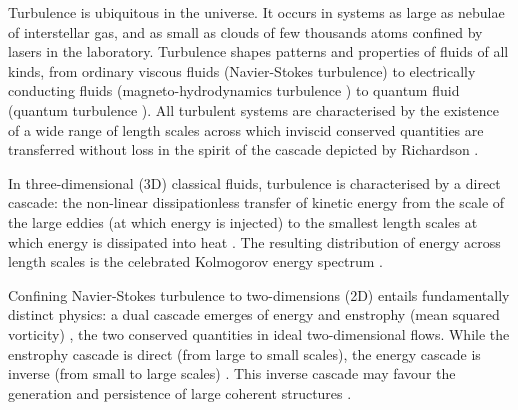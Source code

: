 \documentclass[%
 reprint,
 amsmath,amssymb,
 aps,
 prl,
]{revtex4-2}
\def\magenta#1{\textcolor{magenta}{#1}}
\begin{document}
Turbulence is ubiquitous in the universe.  It occurs in systems
as large as nebulae of interstellar gas, and as small as clouds of
few thousands atoms confined by lasers in the laboratory.
Turbulence shapes patterns and properties of fluids of all
kinds, from ordinary
 viscous fluids (Navier-Stokes turbulence\cite{frisch1995}) 
to electrically conducting fluids (magneto-hydrodynamics turbulence
\cite{canuto-dalsgaard-1998}) to quantum fluid
(quantum turbulence \cite{barenghi-etal-2023,
Barenghi_Skrbek_Sreenivasan_2023}).
All turbulent systems are characterised by 
the existence of a wide range 
of length scales across which inviscid conserved quantities 
are transferred without loss in the spirit of the cascade 
depicted by Richardson \cite{richardson1922weather}. 

In three-dimensional (3D) classical fluids, turbulence 
is characterised by a direct cascade: the
non-linear dissipationless transfer of kinetic energy from the scale of
the large eddies (at which energy is injected) to the smallest length scales
at which energy is dissipated into heat
\cite{richardson1922weather,kolmogorov-1941}. 
The resulting distribution of energy across length scales is
the celebrated Kolmogorov energy spectrum 
\cite{kolmogorov-1941,frisch1995}. 

Confining Navier-Stokes turbulence to two-dimensions (2D) entails 
fundamentally distinct physics: a dual cascade emerges of energy and enstrophy 
(mean squared vorticity) \cite{kraichnan-1967,boffetta-ecke-2012}, 
the two conserved quantities in ideal two-dimensional flows.
While the enstrophy cascade is direct (from large to small
scales), the energy cascade is inverse (from small to large scales)
\cite{boffetta-musacchio-2010}. This inverse cascade 
may favour the generation and persistence of large coherent 
structures \cite{laurie-etal-2014}. 
\end{document}
